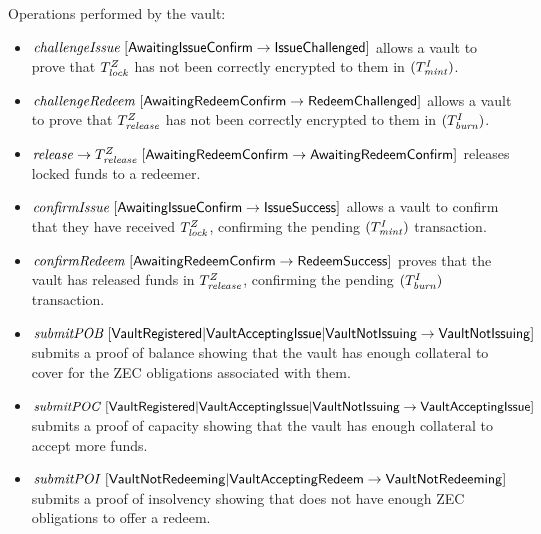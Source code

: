 Operations performed by the vault:
\begin{itemize}
    \item $\mathit{challengeIssue} \; [\mathsf{AwaitingIssueConfirm} \rightarrow \mathsf{IssueChallenged}]$ allows a vault to prove that $T^Z_{\mathit{lock}}$ has not been correctly encrypted to them in $(T^I_{\mathit{mint}})$.
    
    \item $\mathit{challengeRedeem} \; [\mathsf{AwaitingRedeemConfirm} \rightarrow \mathsf{RedeemChallenged}]$ allows a vault to prove that $T^Z_{\mathit{release}}$ has not been correctly encrypted to them in $(T^I_{\mathit{burn}})$.
    
    \item $\mathit{release} \rightarrow T^Z_{\mathit{release}} \; [\mathsf{AwaitingRedeemConfirm} \rightarrow \mathsf{AwaitingRedeemConfirm}]$ releases locked funds to a redeemer.
    
    \item $\mathit{confirmIssue} \; [\mathsf{AwaitingIssueConfirm} \rightarrow \mathsf{IssueSuccess}]$ allows a vault to confirm that they have received $T^Z_{\mathit{lock}}$, confirming the pending $(T^I_{\mathit{mint}})$ transaction.
    
    \item $\mathit{confirmRedeem} \; [\mathsf{AwaitingRedeemConfirm} \rightarrow \mathsf{RedeemSuccess}]$ proves that the vault has released funds in $T^Z_{\mathit{release}}$, confirming the pending $(T^I_{\mathit{burn}})$ transaction.
    
    \item
    \begin{sloppypar}
    $\mathit{submitPOB} \; [\mathsf{VaultRegistered}|\mathsf{VaultAcceptingIssue}|\allowbreak\mathsf{VaultNotIssuing} \rightarrow \mathsf{VaultNotIssuing}]$ submits a proof of balance showing that the vault has enough collateral to cover for the ZEC obligations associated with them.
    \end{sloppypar}
    
    \item
    \begin{sloppypar}
    $\mathit{submitPOC} \; [\mathsf{VaultRegistered}|\mathsf{VaultAcceptingIssue}|\mathsf{VaultNotIssuing} \rightarrow \mathsf{VaultAcceptingIssue}]$ submits a proof of capacity showing that the vault has enough collateral to accept more funds.
    \end{sloppypar}
    
    \item
    \begin{sloppypar}
    $\mathit{submitPOI} \; [\mathsf{VaultNotRedeeming}|\mathsf{Vault\-Accepting\-Redeem} \rightarrow \mathsf{VaultNotRedeeming}]$ submits a proof of insolvency showing that \vault does not have enough ZEC obligations to offer a redeem.
    \end{sloppypar}
\end{itemize}

